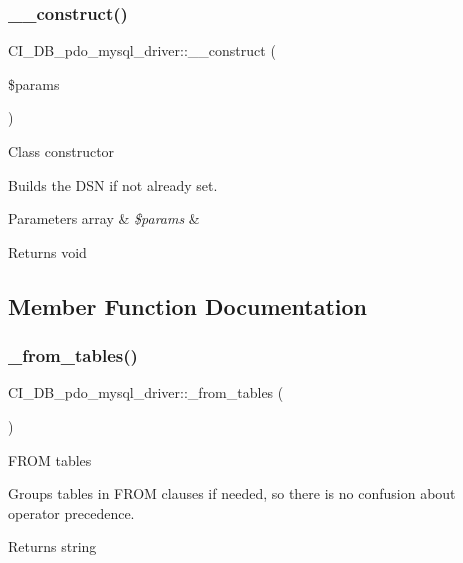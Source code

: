 \subsubsection{\texorpdfstring{\+\_\+\+\_\+construct()}{\_\_construct()}}
{\footnotesize\ttfamily C\+I\+\_\+\+D\+B\+\_\+pdo\+\_\+mysql\+\_\+driver\+::\+\_\+\+\_\+construct (\begin{DoxyParamCaption}\item[{}]{\$params }\end{DoxyParamCaption})}

Class constructor

Builds the D\+SN if not already set.


\begin{DoxyParams}[1]{Parameters}
array & {\em \$params} & \\
\hline
\end{DoxyParams}
\begin{DoxyReturn}{Returns}
void 
\end{DoxyReturn}


\subsection{Member Function Documentation}
\mbox{\label{class_c_i___d_b__pdo__mysql__driver_a98192a1024074e9dd8722706e2dc1f96}} 
\subsubsection{\texorpdfstring{\+\_\+from\+\_\+tables()}{\_from\_tables()}}
{\footnotesize\ttfamily C\+I\+\_\+\+D\+B\+\_\+pdo\+\_\+mysql\+\_\+driver\+::\+\_\+from\+\_\+tables (\begin{DoxyParamCaption}{ }\end{DoxyParamCaption})\hspace{0.3cm}{\ttfamily [protected]}}

F\+R\+OM tables

Groups tables in F\+R\+OM clauses if needed, so there is no confusion about operator precedence.

\begin{DoxyReturn}{Returns}
string 
\end{DoxyReturn}
\mbox{\label{class_c_i___d_b__pdo__mysql__driver_abbb2f9f35645c5f93851abacadfc92b1}} 
